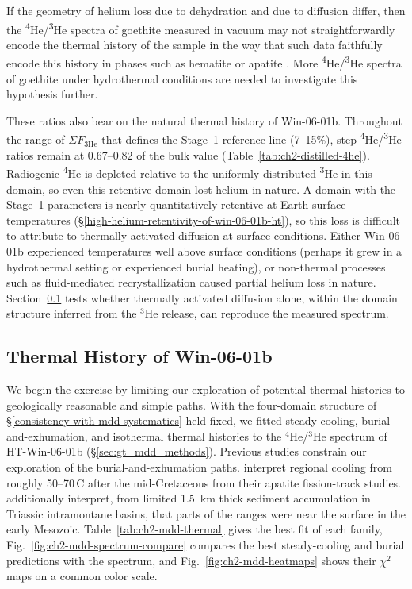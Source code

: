 If the geometry of helium loss due to dehydration and due to diffusion
differ, then the \textsuperscript{4}He/\textsuperscript{3}He spectra of goethite measured in vacuum may not
straightforwardly encode the thermal history of the sample in the way that such
data faithfully encode this history in phases such as hematite or apatite
\citep{farleymckeon2015,shusterfarley2004}. More \textsuperscript{4}He/\textsuperscript{3}He spectra of goethite under hydrothermal
conditions are needed to investigate this hypothesis further. 

These ratios also bear on the natural thermal history of Win-06-01b. Throughout the range of
$\Sigma F_{3\mathrm{He}}$ that defines the Stage~1 reference line (7--15\%), step \textsuperscript{4}He/\textsuperscript{3}He
ratios remain at 0.67--0.82 of the bulk value (Table~\ref{tab:ch2-distilled-4he}).
Radiogenic \textsuperscript{4}He is depleted relative to the uniformly distributed \textsuperscript{3}He in this domain, 
so even this retentive domain lost helium in nature. A domain with the
Stage~1 parameters is nearly quantitatively retentive at Earth-surface temperatures
(\S\ref{high-helium-retentivity-of-win-06-01b-ht}), so this loss is difficult to attribute to thermally activated
diffusion at surface conditions. Either Win-06-01b experienced temperatures well above surface conditions 
(perhaps it grew in a hydrothermal setting or experienced burial heating), or non-thermal processes such as fluid-mediated
recrystallization caused partial helium loss in nature. Section~\ref{sec:gt_thermal_history}
tests whether thermally activated diffusion alone, within the domain structure inferred from
the $^3$He release, can reproduce the measured spectrum. 

\subsection{Thermal History of Win-06-01b}\label{sec:gt_thermal_history}

We begin the exercise by limiting our exploration of potential thermal histories to 
geologically reasonable and simple paths. With the four-domain structure of
\S\ref{consistency-with-mdd-systematics} held fixed, we fitted steady-cooling,
burial-and-exhumation, and isothermal thermal histories to the $^4$He/$^3$He spectrum of HT-Win-06-01b
(\S\ref{sec:gt_mdd_methods}). Previous studies constrain our exploration of the burial-and-exhumation paths. 
\citet{gibsonstuwe2000,mitchell1998} interpret regional cooling 
from roughly 50--70\,\textdegree C after the mid-Cretaceous from their apatite
fission-track studies. \citet{mitchell1998} additionally interpret, from limited 1.5~km thick sediment accumulation 
in Triassic intramontane basins, that parts of the ranges were near the surface in the early
Mesozoic.  Table~\ref{tab:ch2-mdd-thermal} gives the best fit of each
family, Fig.~\ref{fig:ch2-mdd-spectrum-compare} compares the best steady-cooling and burial
predictions with the spectrum, and Fig.~\ref{fig:ch2-mdd-heatmaps} shows their $\chi^2$ maps on a
common color scale.

